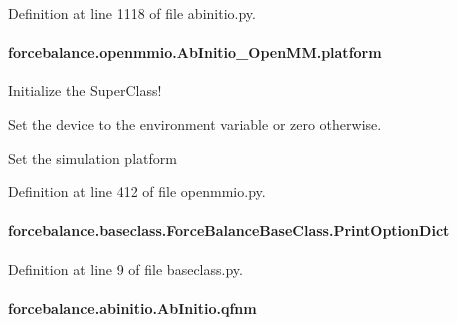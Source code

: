 Definition at line 1118 of file abinitio.\-py.

\hypertarget{classforcebalance_1_1openmmio_1_1AbInitio__OpenMM_ae6977017b553e5d6dd47258f67fcdf1c}{
\paragraph[{platform}]{\setlength{\rightskip}{0pt plus 5cm}forcebalance.\-openmmio.\-Ab\-Initio\-\_\-\-Open\-M\-M.\-platform}}\label{classforcebalance_1_1openmmio_1_1AbInitio__OpenMM_ae6977017b553e5d6dd47258f67fcdf1c}


Initialize the Super\-Class! 

Set the device to the environment variable or zero otherwise.

Set the simulation platform 

Definition at line 412 of file openmmio.\-py.

\hypertarget{classforcebalance_1_1baseclass_1_1ForceBalanceBaseClass_a5c55e661e746d1a4443f4e0bc34ebe05}{
\paragraph[{Print\-Option\-Dict}]{\setlength{\rightskip}{0pt plus 5cm}forcebalance.\-baseclass.\-Force\-Balance\-Base\-Class.\-Print\-Option\-Dict\hspace{0.3cm}{\ttfamily [inherited]}}}\label{classforcebalance_1_1baseclass_1_1ForceBalanceBaseClass_a5c55e661e746d1a4443f4e0bc34ebe05}


Definition at line 9 of file baseclass.\-py.

\hypertarget{classforcebalance_1_1abinitio_1_1AbInitio_ac93db408472034937e79572bf872886c}{
\paragraph[{qfnm}]{\setlength{\rightskip}{0pt plus 5cm}forcebalance.\-abinitio.\-Ab\-Initio.\-qfnm\hspace{0.3cm}{\ttfamily [inherited]}}}\label{classforcebalance_1_1abinitio_1_1AbInitio_ac93db408472034937e79572bf872886c}



